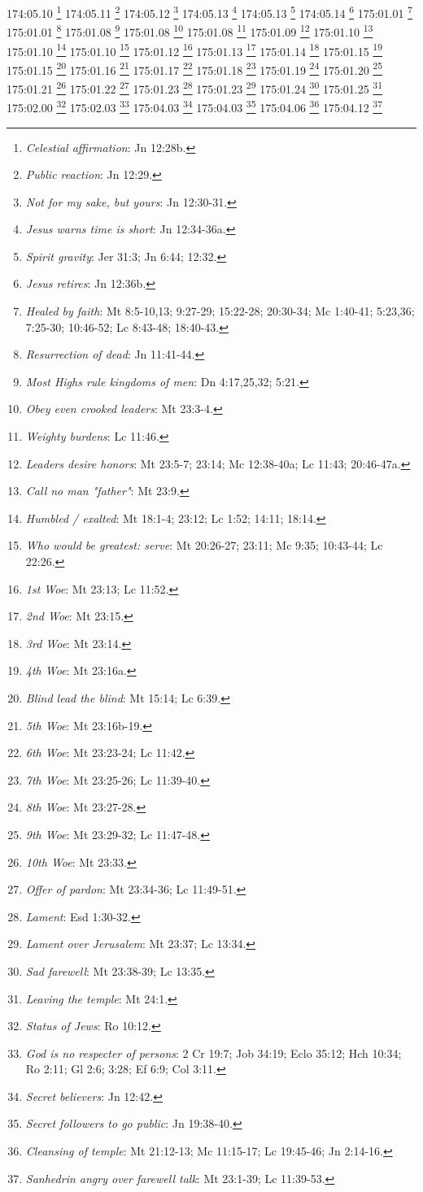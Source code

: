 174:05.10 \footnote{\textit{Celestial affirmation}: Jn 12:28b.}
174:05.11 \footnote{\textit{Public reaction}: Jn 12:29.}
174:05.12 \footnote{\textit{Not for my sake, but yours}: Jn 12:30-31.}
174:05.13 \footnote{\textit{Jesus warns time is short}: Jn 12:34-36a.}
174:05.13 \footnote{\textit{Spirit gravity}: Jer 31:3; Jn 6:44; 12:32.}
174:05.14 \footnote{\textit{Jesus retires}: Jn 12:36b.}
175:01.01 \footnote{\textit{Healed by faith}: Mt 8:5-10,13; 9:27-29; 15:22-28; 20:30-34; Mc 1:40-41; 5:23,36; 7:25-30; 10:46-52; Lc 8:43-48; 18:40-43.}
175:01.01 \footnote{\textit{Resurrection of dead}: Jn 11:41-44.}
175:01.08 \footnote{\textit{Most Highs rule kingdoms of men}: Dn 4:17,25,32; 5:21.}
175:01.08 \footnote{\textit{Obey even crooked leaders}: Mt 23:3-4.}
175:01.08 \footnote{\textit{Weighty burdens}: Lc 11:46.}
175:01.09 \footnote{\textit{Leaders desire honors}: Mt 23:5-7; 23:14; Mc 12:38-40a; Lc 11:43; 20:46-47a.}
175:01.10 \footnote{\textit{Call no man "father"}: Mt 23:9.}
175:01.10 \footnote{\textit{Humbled / exalted}: Mt 18:1-4; 23:12; Lc 1:52; 14:11; 18:14.}
175:01.10 \footnote{\textit{Who would be greatest: serve}: Mt 20:26-27; 23:11; Mc 9:35; 10:43-44; Lc 22:26.}
175:01.12 \footnote{\textit{1st Woe}: Mt 23:13; Lc 11:52.}
175:01.13 \footnote{\textit{2nd Woe}: Mt 23:15.}
175:01.14 \footnote{\textit{3rd Woe}: Mt 23:14.}
175:01.15 \footnote{\textit{4th Woe}: Mt 23:16a.}
175:01.15 \footnote{\textit{Blind lead the blind}: Mt 15:14; Lc 6:39.}
175:01.16 \footnote{\textit{5th Woe}: Mt 23:16b-19.}
175:01.17 \footnote{\textit{6th Woe}: Mt 23:23-24; Lc 11:42.}
175:01.18 \footnote{\textit{7th Woe}: Mt 23:25-26; Lc 11:39-40.}
175:01.19 \footnote{\textit{8th Woe}: Mt 23:27-28.}
175:01.20 \footnote{\textit{9th Woe}: Mt 23:29-32; Lc 11:47-48.}
175:01.21 \footnote{\textit{10th Woe}: Mt 23:33.}
175:01.22 \footnote{\textit{Offer of pardon}: Mt 23:34-36; Lc 11:49-51.}
175:01.23 \footnote{\textit{Lament}: Esd 1:30-32.}
175:01.23 \footnote{\textit{Lament over Jerusalem}: Mt 23:37; Lc 13:34.}
175:01.24 \footnote{\textit{Sad farewell}: Mt 23:38-39; Lc 13:35.}
175:01.25 \footnote{\textit{Leaving the temple}: Mt 24:1.}
175:02.00 \footnote{\textit{Status of Jews}: Ro 10:12.}
175:02.03 \footnote{\textit{God is no respecter of persons}: 2 Cr 19:7; Job 34:19; Eclo 35:12; Hch 10:34; Ro 2:11; Gl 2:6; 3:28; Ef 6:9; Col 3:11.}
175:04.03 \footnote{\textit{Secret believers}: Jn 12:42.}
175:04.03 \footnote{\textit{Secret followers to go public}: Jn 19:38-40.}
175:04.06 \footnote{\textit{Cleansing of temple}: Mt 21:12-13; Mc 11:15-17; Lc 19:45-46; Jn 2:14-16.}
175:04.12 \footnote{\textit{Sanhedrin angry over farewell talk}: Mt 23:1-39; Lc 11:39-53.}
